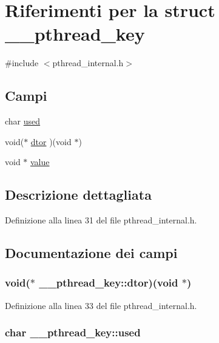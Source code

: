 \hypertarget{struct____pthread__key}{\section{Riferimenti per la struct \+\_\+\+\_\+pthread\+\_\+key}
\label{struct____pthread__key}
}


{\ttfamily \#include $<$pthread\+\_\+internal.\+h$>$}

\subsection*{Campi}
\begin{DoxyCompactItemize}
\item 
char \hyperlink{struct____pthread__key_a81c10bf0d5d76671f389c4aec1af2e1b}{used}
\item 
void($\ast$ \hyperlink{struct____pthread__key_a8a2c00bb7dbce7d43b3078c6214bc390}{dtor} )(void $\ast$)
\item 
void $\ast$ \hyperlink{struct____pthread__key_a35d38627e4a0de2e247671f0b5b6322a}{value}
\end{DoxyCompactItemize}


\subsection{Descrizione dettagliata}


Definizione alla linea 31 del file pthread\+\_\+internal.\+h.



\subsection{Documentazione dei campi}
\hypertarget{struct____pthread__key_a8a2c00bb7dbce7d43b3078c6214bc390}{
\subsubsection[{dtor}]{\setlength{\rightskip}{0pt plus 5cm}void($\ast$ \+\_\+\+\_\+pthread\+\_\+key\+::dtor)(void $\ast$)}}\label{struct____pthread__key_a8a2c00bb7dbce7d43b3078c6214bc390}


Definizione alla linea 33 del file pthread\+\_\+internal.\+h.

\hypertarget{struct____pthread__key_a81c10bf0d5d76671f389c4aec1af2e1b}{
\subsubsection[{used}]{\setlength{\rightskip}{0pt plus 5cm}char \+\_\+\+\_\+pthread\+\_\+key\+::used}}\label{struct____pthread__key_a81c10bf0d5d76671f389c4aec1af2e1b}


